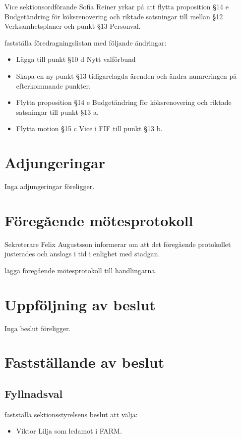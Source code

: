 \documentclass[hidelinks]{sektionsmote}
\begin{document}
Vice sektionsordförande Sofia Reiner yrkar på att flytta proposition §14 e Budgetändring för köksrenovering och riktade satsningar till mellan §12 Verksamhetsplaner och punkt §13 Personval.
\begin{beslut}\label{beslut:foredragningslista-1}
  \item fastställa föredragningslistan med följande ändringar:
  \begin{itemize}
    \item Lägga till punkt §10 d Nytt valförbund
    \item Skapa en ny punkt §13 tidigarelagda ärenden och ändra numreringen på efterkommande punkter.
    \item Flytta proposition §14 e Budgetändring för köksrenovering och riktade satsningar till punkt §13 a.
    \item Flytta motion §15 c Vice i FIF till punkt §13 b.
  \end{itemize}
\end{beslut}


\section{Adjungeringar}
Inga adjungeringar föreligger.


\section{Föregående mötesprotokoll}
Sekreterare Felix Augustsson informerar om att det föregående protokollet justerades och anslogs i tid i enlighet med stadgan.
\begin{beslut}
    \item lägga föregående mötesprotokoll till handlingarna. 
\end{beslut}


\section{Uppföljning av beslut}
Inga beslut föreligger.


\section{Fastställande av beslut}
\subsection{Fyllnadsval}
\begin{beslut}
  \item fastställa sektionsstyrelsens beslut att välja:
  \begin{itemize}
      \item Viktor Lilja som ledamot i FARM.
  \end{itemize}
\end{beslut}
\end{document}
